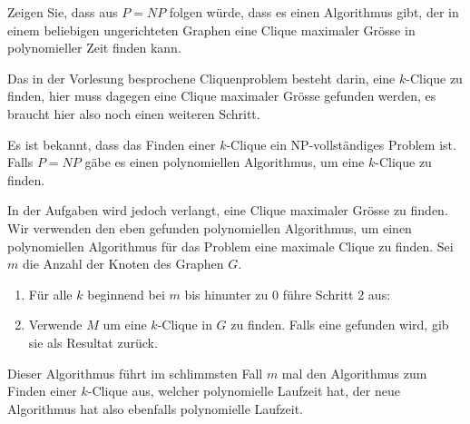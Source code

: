 Zeigen Sie, dass aus $P=NP$ folgen würde, dass es einen Algorithmus
gibt, der in einem beliebigen ungerichteten Graphen eine Clique
maximaler Grösse in polynomieller Zeit finden kann.

\begin{hinweis}
Das in der Vorlesung besprochene Cliquenproblem besteht
darin, eine $k$-Clique zu finden, hier muss dagegen eine Clique maximaler
Grösse gefunden werden, es braucht hier also noch einen weiteren
Schritt.
\end{hinweis}


\begin{loesung}
Es ist bekannt, dass das Finden einer $k$-Clique ein NP-vollständiges
Problem ist. Falls $P=NP$ gäbe es einen polynomiellen Algorithmus, um
eine $k$-Clique zu finden.

In der Aufgaben wird jedoch verlangt, eine Clique maximaler
Grösse zu finden. Wir verwenden den eben gefunden polynomiellen Algorithmus,
um einen polynomiellen Algorithmus für das Problem eine maximale Clique
zu finden.
Sei $m$ die Anzahl der Knoten des Graphen $G$.
\begin{enumerate}
\item Für alle $k$ beginnend bei $m$ bis hinunter zu $0$ führe Schritt 2 aus:
\item Verwende $M$ um eine $k$-Clique in $G$ zu finden. Falls eine
gefunden wird, gib sie als Resultat zurück.
\end{enumerate}
Dieser Algorithmus führt im schlimmsten Fall $m$ mal den Algorithmus zum
Finden einer $k$-Clique aus, welcher polynomielle Laufzeit hat, der neue
Algorithmus hat also ebenfalls polynomielle Laufzeit.
\end{loesung}
